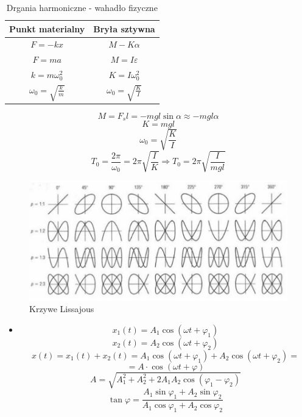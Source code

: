 \documentclass{article}
\begin{document}
\begin{enumerate}
		\begin{table}[h]
			\centering
			\caption{Drgania harmoniczne - wahadło fizyczne}
			\label{tab:Drgania harmoniczne - wahadło fizyczne}
			\begin{tabular}{|c|c|}
				\hline
				\textbf{Punkt materialny} & \textbf{Bryła sztywna} \\
				\hline
				$F = -kx$ & $M -K\alpha$  \\
				\hline
				$F = ma$ & $M = I \varepsilon$ \\
				\hline
				$k = m \omega_0^2$ & $K = I \omega_0^2$ \\
				\hline
				$\omega_0 = \sqrt{\frac{k}{m}}$ & $\omega_0 = \sqrt{\frac{K}{I}}$ \\
				\hline
			\end{tabular}
		\end{table}
		\[
		M = F_sl = -mgl \sin \alpha \approx -mgl \alpha
		\]
		\[
		K = mgl
		\]
		\[
		\omega_0 = \sqrt{\frac{K}{I}}
		\]
		\newpage
		\[
		T_0 = \frac{2 \pi}{\omega_0} = 2 \pi \sqrt{\frac{I}{K}} \Rightarrow T_0 = 2 \pi \sqrt{\frac{I}{mgl}}
		\]
		\begin{figure}[h]
			\centering
			\includegraphics[width=1\textwidth]{krzywe_Lissajous.png}
			\caption{Krzywe Lissajous}
			\label{fig:krzywe_Lissajous}
		\end{figure}
		\begin{itemize}
			\item {}
			\[
			x_1(t) = A_1 \cos(\omega t + \varphi_1)
			\]
			\[
			x_2(t) = A_2 \cos (\omega t + \varphi_2)
			\]
			\[
			x(t) = x_1(t) + x_2(t) = A_1 \cos (\omega t + \varphi_1) + A_2 \cos (\omega t + \varphi_2) =
			\]
			\[
			= A \cdot \cos (\omega t + \varphi)
			\]
			\[
			A = \sqrt{A_1^2 + A_2^2 + 2A_1A_2\cos(\varphi_1 - \varphi_2)}
			\]
			\[
			\tan \varphi = \frac{A_1 \sin \varphi_1 + A_2 \sin \varphi_2}{A_1 \cos \varphi_1 + A_2 \cos \varphi_2}
\]
\end{itemize}
\end{enumerate}
\end{document}
